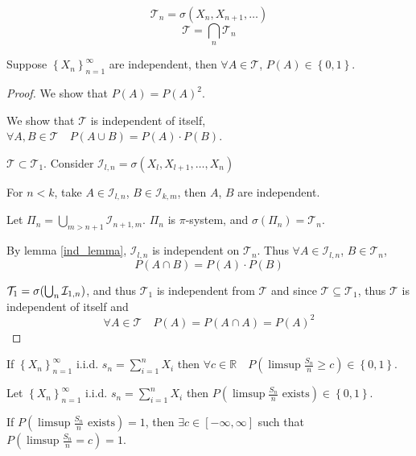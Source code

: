 
\begin{theorem}
	
	$$\mathcal{T}_n = \sigma (X_n, X_{n+1}, \dots)$$
	$$\mathcal{T} = \bigcap_n \mathcal{T}_n$$
	
	
	Suppose $\left\{ X_n\right\}_{n=1}^\infty$ are independent, then $\forall A\in \mathcal{T}$, $P(A) \in \left\{ 0,1\right\}$.
	
	\begin{proof}
		We show that $P(A)=P(A)^2$.
		
		We show that $\mathcal{T}$ is independent of itself, $\forall A,B \in \mathcal{T} \quad P(A\cup B) = P(A)\cdot P(B)$.
		
		$\mathcal{T} \subset \mathcal{T}_1$. Consider $\mathcal{I}_{l,n} = \sigma (X_l, X_{l+1}, \dots, X_n)$
		
		For $n<k$, take $A\in\mathcal{I}_{l,n} $, $B\in\mathcal{I}_{k,m} $, then $A$, $B$ are independent.
		
		Let $\Pi_n = \bigcup_{m>n+1} \mathcal{I}_{n+1,m}$. $\Pi_n$ is $\pi$-system, and $\sigma(\Pi_n) = \mathcal{T}_n$.
		
		By lemma \ref{ind_lemma}, $\mathcal{I}_{l,n} $ is independent on $\mathcal{T}_n$. Thus $\forall A \in \mathcal{I}_{l,n}$, $B \in \mathcal{T}_n$,
		$$P(A\cap B) = P(A) \cdot P(B)$$
		
		$\mathcal{T}_1 = \sigma\qty(\bigcup_n \mathcal{I}_{1,n})$, and thus $\mathcal{T}_1$ is independent from $\mathcal{T}$ and since $\mathcal{T} \subseteq \mathcal{T}_1$, thus $\mathcal{T}$ is independent of itself and 
		$$\forall A\in \mathcal{T} \quad P(A) = P(A\cap A) = P(A)^2 $$
		
	\end{proof}
	\begin{coll}
		If $\left\{ X_n\right\}_{n=1}^\infty$ i.i.d. $s_n = \sum_{i=1}^n X_i$ then $\forall c\in \mathbb{R} \quad P(\limsup \frac{S_n}{n}\geq c) \in \left\{ 0,1 \right\} $.
	\end{coll}
\end{theorem}


\begin{prop}
Let $\left\{ X_n\right\}_{n=1}^\infty$ i.i.d. $s_n = \sum_{i=1}^n X_i$ then $ P(\limsup \frac{S_n}{n} \text{ exists}) \in \left\{ 0,1 \right\} $.

If $ P(\limsup \frac{S_n}{n} \text{ exists}) = 1 $, then 
$\exists c \in [-\infty, \infty]$ such that $P(\limsup \frac{S_n}{n} = c) = 1$.
\end{prop}

